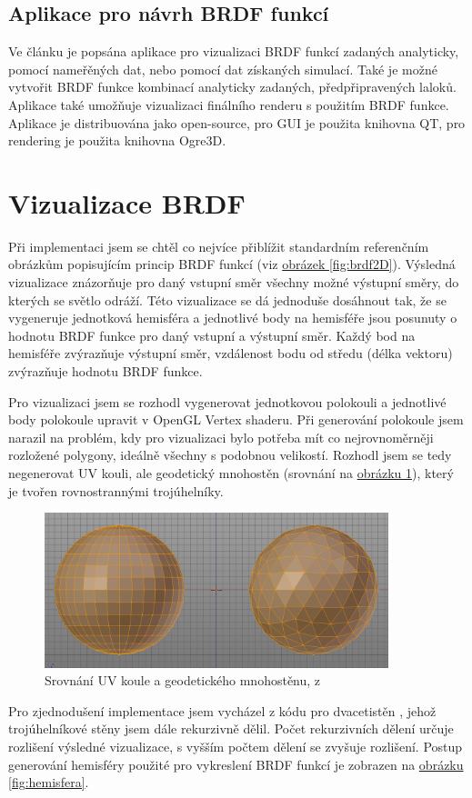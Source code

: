 \documentclass[czech,master]{diploma}
\begin{document}
\subsection{Aplikace pro návrh BRDF funkcí}
Ve článku \cite{Fors2009BRDFLabAG} je popsána aplikace pro vizualizaci BRDF funkcí zadaných analyticky, pomocí nameřěných dat, nebo pomocí dat získaných simulací. Také je možné vytvořit BRDF funkce kombinací analyticky zadaných, předpřipravených laloků. Aplikace také umožňuje vizualizaci finálního renderu s použitím BRDF funkce. Aplikace je distribuována jako open-source, pro GUI je použita knihovna QT, pro rendering je použita knihovna Ogre3D.
\par

\section{Vizualizace BRDF}
Při implementaci jsem se chtěl co nejvíce přiblížit standardním referenčním obrázkům popisujícím princip BRDF funkcí (viz \hyperref[fig:brdf2D]{obrázek \ref{fig:brdf2D}}). Výsledná vizualizace znázorňuje  pro daný vstupní směr všechny možné výstupní směry, do kterých se světlo odráží. Této vizualizace se dá jednoduše dosáhnout tak, že se vygeneruje jednotková hemisféra a jednotlivé body na hemisféře jsou posunuty o hodnotu BRDF funkce pro daný vstupní a výstupní směr. Každý bod na hemisféře zvýrazňuje výstupní směr, vzdálenost bodu od středu (délka vektoru) zvýrazňuje hodnotu BRDF funkce. \par
Pro vizualizaci jsem se rozhodl vygenerovat jednotkovou polokouli a jednotlivé body polokoule upravit v OpenGL Vertex shaderu. Při generování polokoule jsem narazil na problém, kdy pro vizualizaci bylo potřeba mít co nejrovnoměrněji rozložené polygony, ideálně všechny s podobnou velikostí. Rozhodl jsem se tedy negenerovat UV kouli, ale geodetický mnohostěn (srovnání na \hyperref[fig:spheresComparison]{obrázku \ref{fig:spheresComparison}}), který je tvořen rovnostrannými trojúhelníky.  \par

\begin{figure}[ht]
  \centering
  \includegraphics[width=10cm]{Figures/IcosphereUVSphereComparison.png}
  \caption{Srovnání UV koule a geodetického mnohostěnu, z \cite{tan_2019}}
  \label{fig:spheresComparison}
\end{figure}
Pro zjednodušení implementace jsem vycházel z kódu pro dvacetistěn \cite{OpenGLSphere}, jehož trojúhelníkové stěny jsem dále rekurzivně dělil. Počet rekurzivních dělení určuje rozlišení výsledné vizualizace, s vyšším počtem dělení se zvyšuje rozlišení. Postup generování hemisféry použité pro vykreslení BRDF funkcí je zobrazen na \hyperref[fig:hemisfera]{obrázku \ref{fig:hemisfera}}.\par
\end{document}

